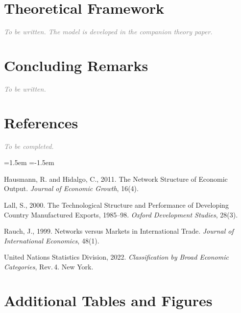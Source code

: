 \documentclass[11pt,a4paper]{article}
\newcommand{\tbw}[1]{\textcolor{gray}{\textit{#1}}}
\begin{document}
\section{Theoretical Framework}\label{sec:model}
\tbw{To be written. The model is developed in the companion theory paper.}


\section{Concluding Remarks}\label{sec:concl}
\tbw{To be written.}


\section*{References}%
\label{sec:refs}
\tbw{To be completed.}
\begin{list}{}{\leftmargin=1.5em \itemindent=-1.5em \itemsep=2pt \topsep=4pt}
\item Hausmann, R. and Hidalgo, C., 2011. The Network Structure of Economic Output.
\emph{Journal of Economic Growth}, 16(4).
\item Lall, S., 2000. The Technological Structure and Performance of Developing Country
Manufactured Exports, 1985--98. \emph{Oxford Development Studies}, 28(3).
\item Rauch, J., 1999. Networks versus Markets in International Trade. \emph{Journal of
International Economics}, 48(1).
\item United Nations Statistics Division, 2022. \emph{Classification by Broad Economic
Categories}, Rev.\,4. New York.
\end{list}


\clearpage
\appendix
\setcounter{figure}{0}
\setcounter{table}{0}

\section{Additional Tables and Figures}\label{sec:app}
\end{document}
